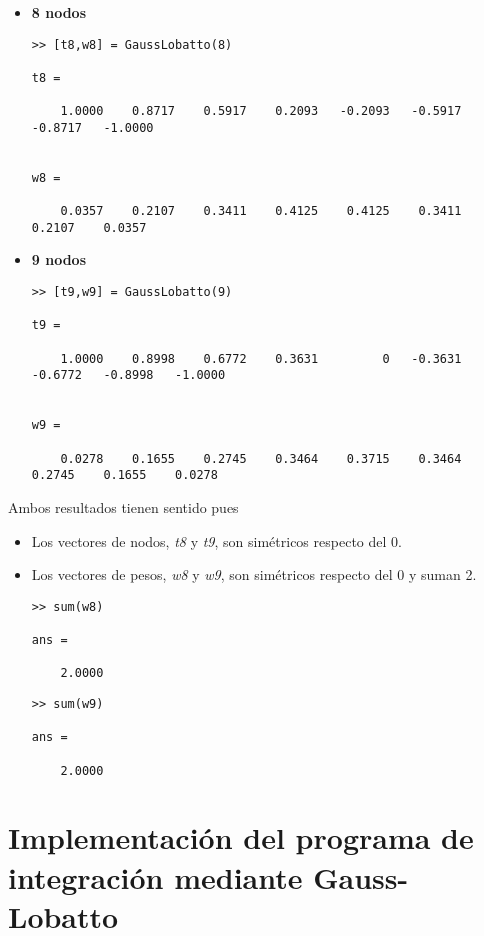 \documentclass[a4paper]{article}
\begin{document}
\begin{itemize}
\item \textbf{8 nodos}
\begin{lstlisting}[frame=single, style=Matlab-Pyglike]
>> [t8,w8] = GaussLobatto(8)

t8 =

    1.0000    0.8717    0.5917    0.2093   -0.2093   -0.5917   -0.8717   -1.0000


w8 =

    0.0357    0.2107    0.3411    0.4125    0.4125    0.3411    0.2107    0.0357
\end{lstlisting}

\item \textbf{9 nodos}
\begin{lstlisting}[frame=single, style=Matlab-Pyglike]
>> [t9,w9] = GaussLobatto(9)

t9 =

    1.0000    0.8998    0.6772    0.3631         0   -0.3631   -0.6772   -0.8998   -1.0000


w9 =

    0.0278    0.1655    0.2745    0.3464    0.3715    0.3464    0.2745    0.1655    0.0278
\end{lstlisting}

\end{itemize}
Ambos resultados tienen sentido pues
\begin{itemize}
\item Los vectores de nodos, \textit{t8} y \textit{t9}, son simétricos respecto del 0. %
\item Los vectores de pesos, \textit{w8} y \textit{w9}, son simétricos respecto del 0 y suman 2. %

\begin{lstlisting}[frame=single, style=Matlab-Pyglike]
>> sum(w8)

ans =

    2.0000
\end{lstlisting}
\begin{lstlisting}[frame=single, style=Matlab-Pyglike]
>> sum(w9)

ans =

    2.0000
\end{lstlisting}
\end{itemize}
\section{Implementación del programa de integración mediante Gauss-Lobatto}
\end{document}
